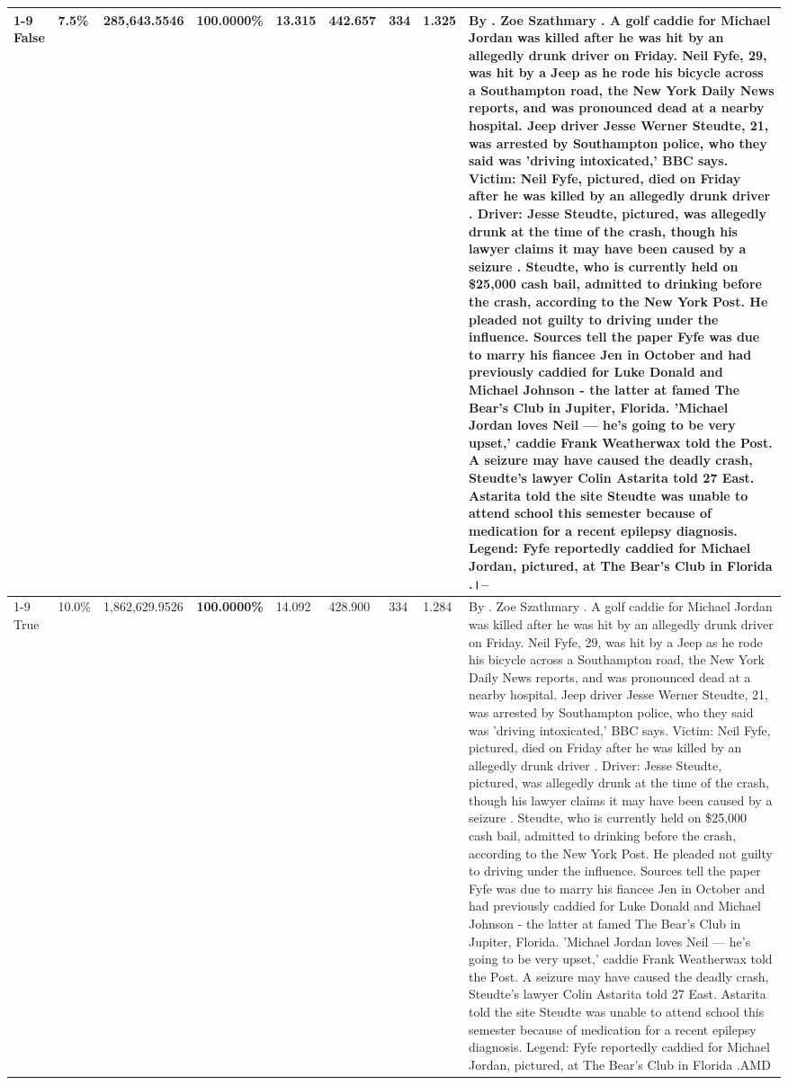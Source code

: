 \begin{table}[H]
\begin{tabular}{lllrlllll}
\cline{1-9}
False & 7.5\% & \color{red} 285,643.5546 & \bfseries \color{red} 100.0000\% & 13.315 & 442.657 & 334 & 1.325 & By . Zoe Szathmary . A golf caddie for Michael Jordan was killed after he was hit by an allegedly drunk driver on Friday. Neil Fyfe, 29, was hit by a Jeep as he rode his bicycle across a Southampton road, the New York Daily News reports, and was pronounced dead at a nearby hospital. Jeep driver Jesse Werner Steudte, 21, was arrested by Southampton police, who they said was 'driving intoxicated,' BBC says. Victim: Neil Fyfe, pictured, died on Friday after he was killed by an allegedly drunk driver . Driver: Jesse Steudte, pictured, was allegedly drunk at the time of the crash, though his lawyer claims it may have been caused by a seizure . Steudte, who is currently held on \$25,000 cash bail, admitted to drinking before the crash, according to the New York Post. He pleaded not guilty to driving under the influence. Sources tell the paper Fyfe was due to marry his fiancee Jen in October and had previously caddied for Luke Donald and Michael Johnson - the latter at famed The Bear's Club in Jupiter, Florida. 'Michael Jordan loves Neil — he’s going to be very upset,' caddie Frank Weatherwax told the Post. A seizure may have caused the deadly crash, Steudte's lawyer Colin Astarita told 27 East. Astarita told the site Steudte was unable to attend school this semester because of medication for a recent epilepsy diagnosis. Legend: Fyfe reportedly caddied for Michael Jordan, pictured, at The Bear's Club in Florida .।-- \\
\cline{1-9}
True & 10.0\% & 1,862,629.9526 & \bfseries \color{red} 100.0000\% & 14.092 & 428.900 & 334 & 1.284 & By . Zoe Szathmary . A golf caddie for Michael Jordan was killed after he was hit by an allegedly drunk driver on Friday. Neil Fyfe, 29, was hit by a Jeep as he rode his bicycle across a Southampton road, the New York Daily News reports, and was pronounced dead at a nearby hospital. Jeep driver Jesse Werner Steudte, 21, was arrested by Southampton police, who they said was 'driving intoxicated,' BBC says. Victim: Neil Fyfe, pictured, died on Friday after he was killed by an allegedly drunk driver . Driver: Jesse Steudte, pictured, was allegedly drunk at the time of the crash, though his lawyer claims it may have been caused by a seizure . Steudte, who is currently held on \$25,000 cash bail, admitted to drinking before the crash, according to the New York Post. He pleaded not guilty to driving under the influence. Sources tell the paper Fyfe was due to marry his fiancee Jen in October and had previously caddied for Luke Donald and Michael Johnson - the latter at famed The Bear's Club in Jupiter, Florida. 'Michael Jordan loves Neil — he’s going to be very upset,' caddie Frank Weatherwax told the Post. A seizure may have caused the deadly crash, Steudte's lawyer Colin Astarita told 27 East. Astarita told the site Steudte was unable to attend school this semester because of medication for a recent epilepsy diagnosis. Legend: Fyfe reportedly caddied for Michael Jordan, pictured, at The Bear's Club in Florida .AMD \\

\end{tabular}
\end{table}
